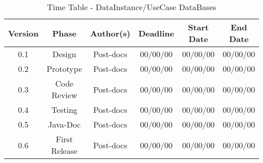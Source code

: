\begin{table}[!htbp]
\caption{Time Table - DataInstance/UseCase DataBases}
\begin{tabular}{cccccc}
\hline
\textbf{Version} & \textbf{Phase} & \textbf{Author(s)} & \textbf{Deadline} & \textbf{Start Date} & \textbf{End Date}\\
\hline
0.1 & Design & Post-docs & 00/00/00 & 00/00/00 & 00/00/00\\
\hline 
0.2 & Prototype & Post-docs & 00/00/00 & 00/00/00 & 00/00/00\\
\hline 
0.3 & Code Review & Post-docs & 00/00/00 & 00/00/00 & 00/00/00\\
\hline 
0.4 & Testing & Post-docs & 00/00/00 & 00/00/00 & 00/00/00\\
\hline 
0.5 & Java-Doc  & Post-docs & 00/00/00 & 00/00/00 & 00/00/00\\
\hline 
0.6 & First Release & Post-docs & 00/00/00 & 00/00/00 & 00/00/00\\
\hline
\end{tabular}
\end{table}